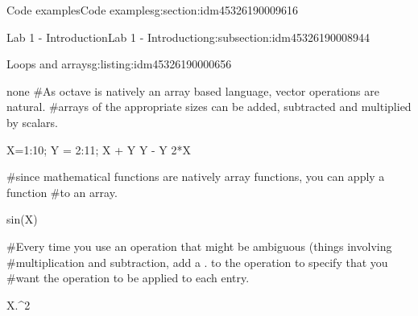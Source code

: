 \documentclass[oneside,10pt,]{article}
\numberwithin{equation}{section}
\numberwithin{equation}{section}
\begin{document}
\begin{sectionptx}{Code examples}{}{Code examples}{}{}{g:section:idm45326190009616}
\begin{subsectionptx}{Lab 1 - Introduction}{}{Lab 1 - Introduction}{}{}{g:subsection:idm45326190008944}
\begin{listingptx}{Loops and arrays}{g:listing:idm45326190000656}{}
\begin{program}{none}
#As octave is natively an array based language, vector operations are natural.
#arrays of the appropriate sizes can be added, subtracted and multiplied by scalars.

X=1:10;
Y = 2:11;
X + Y
Y - Y
2*X

#since mathematical functions are natively array functions, you can apply a function
#to an array.

sin(X)

#Every time you use an operation that might be ambiguous (things involving
#multiplication and subtraction, add a . to the operation to specify that you
#want the operation to be applied to each entry.

X.^2
\end{program}
\tcblower
\end{listingptx}%
\end{subsectionptx}
\end{sectionptx}
%
%
\typeout{************************************************}
\typeout{************************************************}
%
\end{document}
